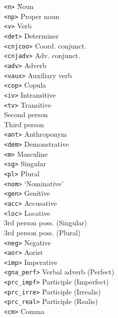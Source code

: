 \documentclass[a0paper,fontscale=0.3]{baposter}  %
\begin{document}
\begin{poster}
{\vspace{-1.5em}
\setlength{\columnsep}{-1em}
\setlength{\topsep}{-\parskip}
\begin{multicols}{3}
\begin{tabbing}
  \texttt{{\small <n>}}\hspace{3.0em} \=  Noun\\[-0.5ex]
  \texttt{{\small <np>}} \> Proper noun\\[-0.5ex]
  \texttt{{\small <v>}} \>  Verb\\[-0.5ex]
  \texttt{{\small <det>}} \>  Determiner\\[-0.5ex]
  \texttt{{\small <cnjcoo>}} \> Coord. conjunct.\\[-0.5ex]
  \texttt{{\small <cnjadv>}} \> Adv. conjunct.\\[-0.5ex]
  \texttt{{\small <adv>}} \> Adverb\\[-0.5ex]
  \texttt{{\small <vaux>}} \> Auxiliary verb\\[-0.5ex]
  \texttt{{\small <cop>}} \> Copula\\[-0.5ex]
  \texttt{{\small <iv>}} \> Intransitive\\[-0.5ex]
  \texttt{{\small <tv>}} \> Transitive\\[-0.5ex]
  \texttt{{}} \> Second person\\[-0.5ex]
  \texttt{{}} \> Third person\\[-0.5ex]
  \texttt{{\small <ant>}} \> Anthroponym\\[-0.5ex]
  \texttt{{\small <dem>}} \> Demonstrative\\[-0.5ex]
  \texttt{{\small <m>}} \> Masculine\\[-0.5ex]
  \texttt{{\small <sg>}} \> Singular\\[-0.5ex]
  \texttt{{\small <pl>}} \> Plural\\[-0.5ex]
  \texttt{{\small <nom>}} \> `Nominative'\\[-0.5ex]
  \texttt{{\small <gen>}} \> Genitive\\[-0.5ex]
  \texttt{{\small <acc>}} \> Accusative\\[-0.5ex]
  \texttt{{\small <loc>}} \> Locative\\[-0.5ex]
  \texttt{{}} \> 3rd person poss. (Singular)\\[-0.5ex]
  \texttt{{}} \> 3rd person poss. (Plural)\\[-0.5ex]
  \texttt{{\small <neg>}} \> Negative\\[-0.5ex]
  \texttt{{\small <aor>}} \> Aorist\\[-0.5ex]
  \texttt{{\small <imp>}} \> Imperative\\[-0.5ex]
  \texttt{{\small <gna\_perf>}} \> Verbal adverb (Perfect)\\[-0.5ex]
  \texttt{{\small <prc\_impf>}} \> Participle (Imperfect)\\[-0.5ex]
  \texttt{{\small <prc\_irre>}} \> Participle (Irrealis)\\[-0.5ex]
  \texttt{{\small <prc\_real>}} \> Participle (Realis)\\[-0.5ex]
  \texttt{{\small <cm>}} \> Comma\\
  

\end{tabbing}
\end{multicols}}
\end{poster}
\end{document}
